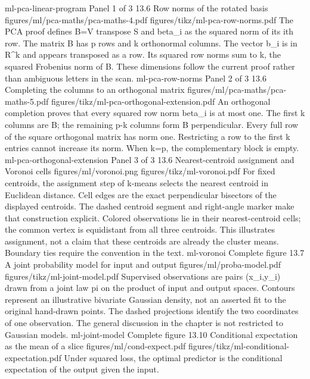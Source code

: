 {ml-pca-linear-program}
{Panel 1 of 3}
{13.6}
{Row norms of the rotated basis}
{figures/ml/pca-maths/pca-maths-4.pdf}
{figures/tikz/ml-pca-row-norms.pdf}
{The PCA proof defines B=V transpose S and beta\_i as the squared norm of its ith row.}
{The matrix B has p rows and k orthonormal columns. The vector b\_i is in R\textasciicircum{}k and appears transposed as a row. Its squared row norms sum to k, the squared Frobenius norm of B. These dimensions follow the current proof rather than ambiguous letters in the scan.}
{ml-pca-row-norms}
{Panel 2 of 3}
{13.6}
{Completing the columns to an orthogonal matrix}
{figures/ml/pca-maths/pca-maths-5.pdf}
{figures/tikz/ml-pca-orthogonal-extension.pdf}
{An orthogonal completion proves that every squared row norm beta\_i is at most one.}
{The first k columns are B; the remaining p-k columns form B perpendicular. Every full row of the square orthogonal matrix has norm one. Restricting a row to the first k entries cannot increase its norm. When k=p, the complementary block is empty.}
{ml-pca-orthogonal-extension}
{Panel 3 of 3}
{13.6}
{Nearest-centroid assignment and Voronoi cells}
{figures/ml/voronoi.png}
{figures/tikz/ml-voronoi.pdf}
{For fixed centroids, the assignment step of k-means selects the nearest centroid in Euclidean distance.}
{Cell edges are the exact perpendicular bisectors of the displayed centroids. The dashed centroid segment and right-angle marker make that construction explicit. Colored observations lie in their nearest-centroid cells; the common vertex is equidistant from all three centroids. This illustrates assignment, not a claim that these centroids are already the cluster means. Boundary ties require the convention in the text.}
{ml-voronoi}
{Complete figure}
{13.7}
{A joint probability model for input and output}
{figures/ml/proba-model.pdf}
{figures/tikz/ml-joint-model.pdf}
{Supervised observations are pairs (x\_i,y\_i) drawn from a joint law pi on the product of input and output spaces.}
{Contours represent an illustrative bivariate Gaussian density, not an asserted fit to the original hand-drawn points. The dashed projections identify the two coordinates of one observation. The general discussion in the chapter is not restricted to Gaussian models.}
{ml-joint-model}
{Complete figure}
{13.10}
{Conditional expectation as the mean of a slice}
{figures/ml/cond-expect.pdf}
{figures/tikz/ml-conditional-expectation.pdf}
{Under squared loss, the optimal predictor is the conditional expectation of the output given the input.}
